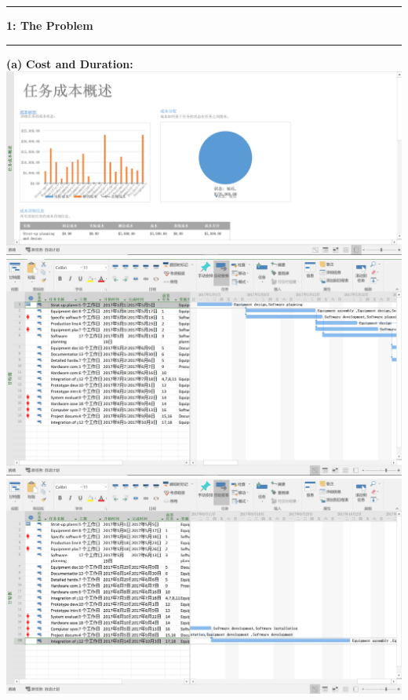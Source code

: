 \documentclass[11pt]{article}
\newcommand\question[2]{\vspace{.25in}\hrule\textbf{#1: #2}\vspace{.5em}\hrule\vspace{.10in}}
\renewcommand\part[1]{\vspace{.10in}\textbf{(#1)}}
\newcommand\algorithm{\vspace{.10in}\textbf{Cost and Duration: }}
\begin{document}
\raggedright
\newcommand\NAME{Yao Xiao}  %
\newcommand\ANDREWID{2019180015}     %
\newcommand\HWNUM{3}              %


\question{1}{The Problem} 

\part{a} \algorithm\\
\includegraphics[scale=0.55]{cost.png}
\includegraphics[scale=0.4]{duration1.png}
\includegraphics[scale=0.4]{duration2.png}
\end{document}
